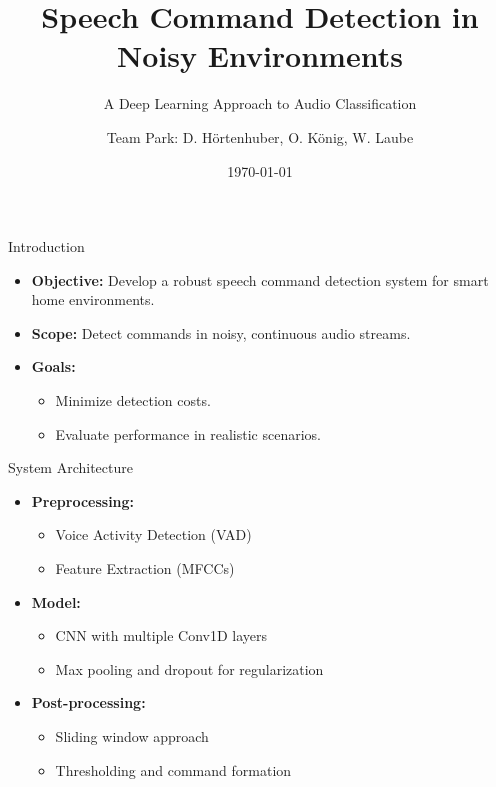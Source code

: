 \documentclass{beamer}
\title{Speech Command Detection in Noisy Environments}
\subtitle{A Deep Learning Approach to Audio Classification}
\author{Team Park: D. Hörtenhuber, O. König, W. Laube}
\institute{JKU \\ MLPC}
\date{\today}
\begin{document}
\begin{frame}
  \titlepage
\end{frame}

\begin{frame}{Introduction}
  \begin{itemize}
    \item \textbf{Objective:} Develop a robust speech command detection system for smart home environments.
    \item \textbf{Scope:} Detect commands in noisy, continuous audio streams.
    \item \textbf{Goals:}
      \begin{itemize}
        \item Minimize detection costs.
        \item Evaluate performance in realistic scenarios.
      \end{itemize}
  \end{itemize}
\end{frame}

\begin{frame}{System Architecture}
  \begin{itemize}
    \item \textbf{Preprocessing:}
      \begin{itemize}
        \item Voice Activity Detection (VAD)
        \item Feature Extraction (MFCCs)
      \end{itemize}
    \item \textbf{Model:}
      \begin{itemize}
        \item CNN with multiple Conv1D layers
        \item Max pooling and dropout for regularization
      \end{itemize}
    \item \textbf{Post-processing:}
      \begin{itemize}
        \item Sliding window approach
        \item Thresholding and command formation
      \end{itemize}
  \end{itemize}
\end{frame}
\end{document}
